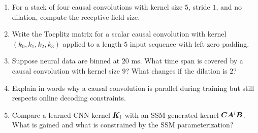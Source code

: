 \begin{enumerate}
  \item For a stack of four causal convolutions with kernel size $5$, stride $1$, and no
  dilation, compute the receptive field size.
  \item Write the Toeplitz matrix for a scalar causal convolution with kernel
  $(k_0,k_1,k_2,k_3)$ applied to a length-$5$ input sequence with left zero padding.
  \item Suppose neural data are binned at $20$ ms. What time span is covered by a causal
  convolution with kernel size $9$? What changes if the dilation is $2$?
  \item Explain in words why a causal convolution is parallel during training but still
  respects online decoding constraints.
  \item Compare a learned CNN kernel $\bm{K}_i$ with an SSM-generated kernel
  $\bm{C}\bm{A}^i\bm{B}$. What is gained and what is constrained by the SSM parameterization?
\end{enumerate}
